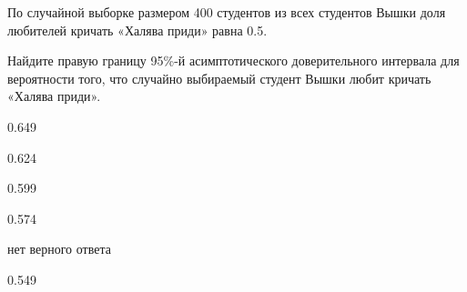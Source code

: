 
\begin{question}
По случайной выборке размером 400 студентов из всех студентов Вышки доля
любителей кричать «Халява приди» равна 0.5.

Найдите правую границу 95\%-й асимптотического доверительного интервала
для вероятности того, что случайно выбираемый студент Вышки любит
кричать «Халява приди».
\begin{answerlist}
  \item 0.649
  \item 0.624
  \item 0.599
  \item 0.574
  \item нет верного ответа
  \item 0.549
\end{answerlist}
\end{question}


